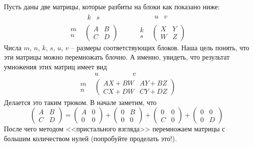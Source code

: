 Пусть даны две матрицы, которые разбиты на блоки как показано ниже:
\[
\begin{matrix}
{}&{
\begin{matrix}
{k}&{s}
\end{matrix}}\\
{
\begin{matrix}
{m}\\
{n}
\end{matrix}}&{
\begin{pmatrix}
{A}&{B}\\
{C}&{D}
\end{pmatrix}}
\end{matrix}
\quad\quad
\begin{matrix}
{}&{
\begin{matrix}
{u}&{v}
\end{matrix}}\\
{
\begin{matrix}
{k}\\
{s}
\end{matrix}}&{
\begin{pmatrix}
{X}&{Y}\\
{W}&{Z}
\end{pmatrix}}
\end{matrix}
\]
Числа $m$, $n$, $k$, $s$, $u$, $v$ -- размеры соответствующих блоков.
Наша цель понять, что эти матрицы можно перемножать блочно.
А именно, увидеть, что результат умножения этих матриц имеет вид
\[
\begin{matrix}
{}&{
u\quad\quad\quad\quad\quad v
}\\
{
\begin{matrix}
{m}\\
{n}
\end{matrix}}&{
\begin{pmatrix}
{A X + B W}&{A Y + B Z}\\
{C X + D W}&{C Y + D Z}
\end{pmatrix}}
\end{matrix}
\]
Делается это таким трюком.
В начале заметим, что
\[
\begin{pmatrix}
{A}&{B}\\
{C}&{D}
\end{pmatrix}
=
\begin{pmatrix}
{A}&{0}\\
{0}&{0}
\end{pmatrix}
+
\begin{pmatrix}
{0}&{B}\\
{0}&{0}
\end{pmatrix}
+
\begin{pmatrix}
{0}&{0}\\
{C}&{0}
\end{pmatrix}
+
\begin{pmatrix}
{0}&{0}\\
{0}&{D}
\end{pmatrix}
\]
После чего методом <<пристального взгляда>> перемножаем матрицы с большим количеством нулей (попробуйте проделать это!).

